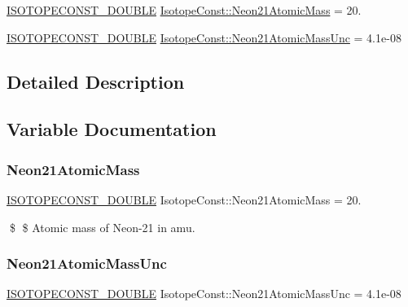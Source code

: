 \begin{DoxyCompactItemize}
\item 
\mbox{\hyperlink{group___isotope_const-_macros_ga8f45a7272ce02c0b4c65c44636ed719a}{I\+S\+O\+T\+O\+P\+E\+C\+O\+N\+S\+T\+\_\+\+D\+O\+U\+B\+LE}} \mbox{\hyperlink{group___isotope_const-_neon-_ne21_gab974680d7949b77f31d1fc6cc3456e8d}{Isotope\+Const\+::\+Neon21\+Atomic\+Mass}} = 20.
\item 
\mbox{\hyperlink{group___isotope_const-_macros_ga8f45a7272ce02c0b4c65c44636ed719a}{I\+S\+O\+T\+O\+P\+E\+C\+O\+N\+S\+T\+\_\+\+D\+O\+U\+B\+LE}} \mbox{\hyperlink{group___isotope_const-_neon-_ne21_ga56957df5965976680f6d9342874f4578}{Isotope\+Const\+::\+Neon21\+Atomic\+Mass\+Unc}} = 4.\+1e-\/08
\end{DoxyCompactItemize}


\subsection{Detailed Description}


\subsection{Variable Documentation}
\mbox{\label{group___isotope_const-_neon-_ne21_gab974680d7949b77f31d1fc6cc3456e8d}} 
\subsubsection{\texorpdfstring{Neon21\+Atomic\+Mass}{Neon21AtomicMass}}
{\footnotesize\ttfamily \mbox{\hyperlink{group___isotope_const-_macros_ga8f45a7272ce02c0b4c65c44636ed719a}{I\+S\+O\+T\+O\+P\+E\+C\+O\+N\+S\+T\+\_\+\+D\+O\+U\+B\+LE}} Isotope\+Const\+::\+Neon21\+Atomic\+Mass = 20.}

\$ \$ Atomic mass of Neon-\/21 in amu. \mbox{\label{group___isotope_const-_neon-_ne21_ga56957df5965976680f6d9342874f4578}} 
\subsubsection{\texorpdfstring{Neon21\+Atomic\+Mass\+Unc}{Neon21AtomicMassUnc}}
{\footnotesize\ttfamily \mbox{\hyperlink{group___isotope_const-_macros_ga8f45a7272ce02c0b4c65c44636ed719a}{I\+S\+O\+T\+O\+P\+E\+C\+O\+N\+S\+T\+\_\+\+D\+O\+U\+B\+LE}} Isotope\+Const\+::\+Neon21\+Atomic\+Mass\+Unc = 4.\+1e-\/08}

